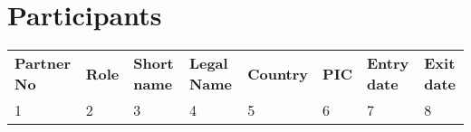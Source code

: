 %
%

\section{Participants}


\def\arraystretch{1.25}
{\fontsize{9}{11}\selectfont

    \setlength{\arrayrulewidth}{0.5pt} %
    \begin{tabularx}{\textwidth}{|X|X|X|X|X|X|X|X|} \hline
        \rowcolor{mylightergray}\multicolumn{8}{|l|}{PARTICIPANTS} \\ \hline
        \rowcolor{mylightergray}
        \textbf{Partner No} & \textbf{Role} & \textbf{Short name} & \textbf{Legal Name} &
        \textbf{Country} & \textbf{PIC} & \textbf{Entry date} & \textbf{Exit date} \\ \hline
        1 & 2 & 3 & 4 & 5 & 6 & 7 & 8 \\ \hline
    \hline
    \end{tabularx}
}